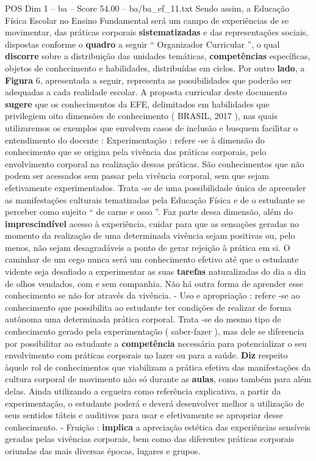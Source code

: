 \begin{textsample}{POS Dim 1 – ba – Score 54.00 – ba/ba\_ef\_11.txt}
Sendo assim, a Educação Física Escolar no Ensino Fundamental será um campo de experiências de se movimentar, das práticas corporais \textbf{sistematizadas} e das representações sociais, dispostas conforme o \textbf{quadro} a seguir “ Organizador Curricular ”, o qual \textbf{discorre} sobre a distribuição das unidades temáticas, \textbf{competências} específicas, objetos de conhecimento e habilidades, distribuídas em ciclos.
Por outro \textbf{lado}, a \textbf{Figura} 6, apresentada a seguir, representa as possibilidades que poderão ser adequadas a cada realidade escolar.
A proposta curricular deste documento \textbf{sugere} que os conhecimentos da EFE, delimitados em habilidades que privilegiem oito dimensões de conhecimento ( BRASIL, 2017 ), nas quais utilizaremos os exemplos que envolvem casos de inclusão e busquem facilitar o entendimento do docente : Experimentação : refere -se à dimensão do conhecimento que se origina pela vivência das práticas corporais, pelo envolvimento corporal na realização dessas práticas.
São conhecimentos que não podem ser acessados sem passar pela vivência corporal, sem que sejam efetivamente experimentados.
Trata -se de uma possibilidade única de apreender as manifestações culturais tematizadas pela Educação Física e de o estudante se perceber como sujeito “ de carne e osso ”.
Faz parte dessa dimensão, além do \textbf{imprescindível} acesso à experiência, cuidar para que as sensações geradas no momento da realização de uma determinada vivência sejam positivas ou, pelo menos, não sejam desagradáveis a ponto de gerar rejeição à prática em si.
O caminhar de um cego nunca será um conhecimento efetivo até que o estudante vidente seja desafiado a experimentar as suas \textbf{tarefas} naturalizadas do dia a dia de olhos vendados, com e sem companhia.
Não há outra forma de aprender esse conhecimento se não for através da vivência. - Uso e apropriação : refere -se ao conhecimento que possibilita ao estudante ter condições de realizar de forma autônoma uma determinada prática corporal.
Trata -se do mesmo tipo de conhecimento gerado pela experimentação ( saber-fazer ), mas dele se diferencia por possibilitar ao estudante a \textbf{competência} necessária para potencializar o seu envolvimento com práticas corporais no lazer ou para a saúde. \textbf{Diz} respeito àquele rol de conhecimentos que viabilizam a prática efetiva das manifestações da cultura corporal de movimento não só durante as \textbf{aulas}, como também para além delas.
Ainda utilizando a cegueira como referência explicativa, a partir da experimentação, o estudante poderá e deverá desenvolver melhor a utilização de seus sentidos táteis e auditivos para usar e efetivamente se apropriar desse conhecimento. - Fruição : \textbf{implica} a apreciação estética das experiências sensíveis geradas pelas vivências corporais, bem como das diferentes práticas corporais oriundas das mais diversas épocas, lugares e grupos.

\end{textsample}
